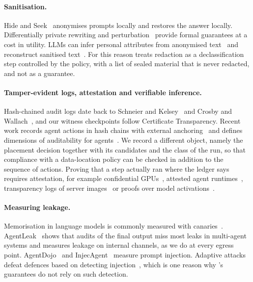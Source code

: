 \paragraph{Sanitisation.} Hide and Seek~\citep{chen2023hideandseek} anonymises prompts locally
and restores the answer locally. Differentially private rewriting and
perturbation~\citep{utpala2023dpprompt,tong2023inferdpt} provide formal guarantees at a cost in
utility. LLMs can infer personal attributes from anonymised text~\citep{staab2024beyond} and
reconstruct sanitised text~\citep{pang2025reconstruction}. For this reason \annona{} treats
redaction as a declassification step controlled by the policy, with a list of sealed material
that is never redacted, and not as a guarantee.

\paragraph{Tamper-evident logs, attestation and verifiable inference.} Hash-chained audit logs
date back to Schneier and Kelsey~\citep{schneier1999audit} and Crosby and
Wallach~\citep{crosby2009tamper}, and our witness checkpoints follow Certificate Transparency.
Recent work records agent actions in hash chains with external anchoring~\citep{bindschaedler2026flight}
and defines dimensions of auditability for agents~\citep{nian2026auditable}. We record a
different object, namely the placement decision together with its candidates and the class of
the run, so that compliance with a data-location policy can be checked in addition to the
sequence of actions. Proving that a step actually ran where the ledger says requires
attestation, for example confidential GPUs~\citep{zhu2024hopper}, attested agent
runtimes~\citep{abdollahi2026agentee}, transparency logs of server images~\citep{apple2024pcc}
or proofs over model activations~\citep{ong2025toploc}.

\paragraph{Measuring leakage.} Memorisation in language models is commonly measured with
canaries~\citep{carlini2019secret}. AgentLeak~\citep{elyagoubi2026agentleak} shows that
audits of the final output miss most leaks in multi-agent systems and measures leakage on
internal channels, as we do at every egress point. AgentDojo~\citep{debenedetti2024agentdojo}
and InjecAgent~\citep{zhan2024injecagent} measure prompt injection. Adaptive attacks defeat
defences based on detecting injection~\citep{zhan2025adaptive}, which is one reason why
\annona's guarantees do not rely on such detection.
